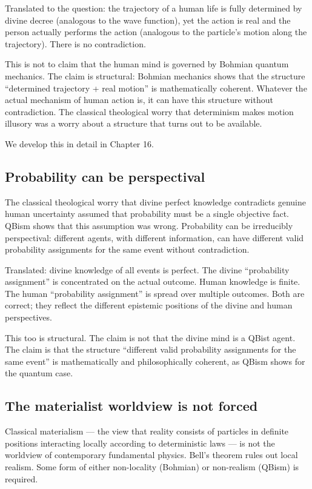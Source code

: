 Translated to the  question: the trajectory of a human
life is fully determined by divine decree (analogous to the wave
function), yet the action is real and the person actually performs
the action (analogous to the particle's motion along the trajectory).
There is no contradiction.

This is not to claim that the human mind is governed by Bohmian
quantum mechanics. The claim is structural: Bohmian mechanics shows
that the structure ``determined trajectory + real motion'' is
mathematically coherent. Whatever the actual mechanism of human
action is, it can have this structure without contradiction. The
classical theological worry that determinism makes motion illusory
was a worry about a structure that turns out to be available.

We develop this in detail in Chapter 16.

\subsection{Probability can be perspectival}

The classical theological worry that divine perfect knowledge
contradicts genuine human uncertainty assumed that probability must
be a single objective fact. QBism shows that this assumption was
wrong. Probability can be irreducibly perspectival: different
agents, with different information, can have different valid
probability assignments for the same event without contradiction.

Translated: divine knowledge of all events is perfect. The divine
``probability assignment'' is concentrated on the actual outcome.
Human knowledge is finite. The human ``probability assignment'' is
spread over multiple outcomes. Both are correct; they reflect the
different epistemic positions of the divine and human perspectives.

This too is structural. The claim is not that the divine mind is a
QBist agent. The claim is that the structure ``different valid
probability assignments for the same event'' is mathematically and
philosophically coherent, as QBism shows for the quantum case.

\subsection{The materialist worldview is not forced}

Classical materialism --- the view that reality consists of
particles in definite positions interacting locally according to
deterministic laws --- is not the worldview of contemporary
fundamental physics. Bell's theorem rules out local realism. Some
form of either non-locality (Bohmian) or non-realism (QBism) is
required.

